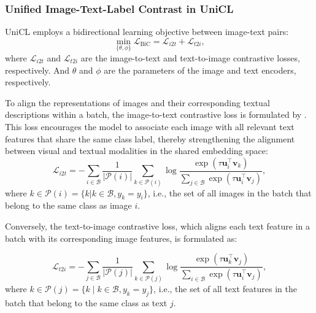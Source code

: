 \subsubsection{Unified Image-Text-Label Contrast in UniCL}
\label{subsec:unified_image_text_label_contrast}

UniCL employs a bidirectional learning objective between image-text pairs:
\begin{equation} \label{eq:unified_image_text_label_contrast}
    \min_{\{\theta, \phi\}} \mathcal{L}_{\text{BiC}} = \mathcal{L}_{i2t} + \mathcal{L}_{t2i},
\end{equation}
where \(\mathcal{L}_{i2t}\) and \(\mathcal{L}_{t2i}\) are the image-to-text and text-to-image contrastive losses, respectively. And \(\theta\) and \(\phi\) are the parameters of the image and text encoders, respectively.

To align the representations of images and their corresponding textual descriptions within a batch, the image-to-text contrastive loss is formulated by \cite{vl_unicl}. This loss encourages the model to associate each image with all relevant text features that share the same class label, thereby strengthening the alignment between visual and textual modalities in the shared embedding space:
\begin{equation} \label{eq:unicl_image_to_text_contrastive_loss}
    \mathcal{L}_{i2t} = - \sum_{i \in \mathcal{B}} \frac{1}{|\mathcal{P}(i)|} \sum_{k \in \mathcal{P}(i)} 
    \log \frac{\exp(\tau \mathbf{u}_i^\top \mathbf{v}_k)}{\sum_{j \in \mathcal{B}} \exp(\tau \mathbf{u}_i^\top \mathbf{v}_j)},
\end{equation}
where $k \in \mathcal{P}(i) = \{k | k \in \mathcal{B}, y_k = y_i\}$, i.e., the set of all images in the batch that belong to the same class as image $i$.

Conversely, the text-to-image contrastive loss, which aligns each text feature in a batch with its corresponding image features, is formulated as:

\begin{equation} \label{eq:unicl_text_to_image_contrastive_loss}
    \mathcal{L}_{t2i} = - \sum_{j \in \mathcal{B}} \frac{1}{|\mathcal{P}(j)|} \sum_{k \in \mathcal{P}(j)} 
    \log \frac{\exp(\tau \mathbf{u}_k^\top \mathbf{v}_j)}{\sum_{i \in \mathcal{B}} \exp(\tau \mathbf{u}_i^\top \mathbf{v}_j)},
\end{equation}
where $k \in \mathcal{P}(j) = \{k \mid k \in \mathcal{B}, y_k = y_j\}$, i.e., the set of all text features in the batch that belong to the same class as text $j$.

